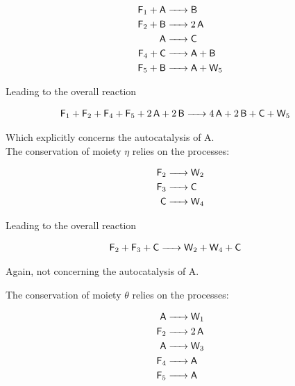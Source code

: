 \documentclass{article}
\begin{document}
\begin{equation}\label{reaction_12}
		\begin{split}
  \ce{\textsf{F}_1 + \textsf{A}& -> \textsf{B}}	\\
  \ce{\textsf{F}_2 + \textsf{B}& -> 2\textsf{A}} \\
  \ce{\textsf{A}& -> \textsf{C}} \\
  \ce{\textsf{F}_4 + \textsf{C}& -> \textsf{A} + \textsf{B}} \\
  \ce{\textsf{F}_5 + \textsf{B}& -> \textsf{A} + \textsf{W}_5 }
		\end{split} 
\end{equation}

Leading to the overall reaction

\begin{equation}
		\begin{split}
  \ce{\textsf{F}_1 + \textsf{F}_2 + \textsf{F}_4 + \textsf{F}_5 + 2\textsf{A} + 2\textsf{B} &-> 4\textsf{A} + 2\textsf{B} + \textsf{C} + \textsf{W}_5 }
		\end{split} 
\end{equation}

Which explicitly concerns the autocatalysis of A. \\

The conservation of moiety $\eta$ relies on the processes:

\begin{equation}\label{reaction_12}
		\begin{split}
  \ce{\textsf{F}_2 & -> \textsf{W}_2}	\\
  \ce{\textsf{F}_3 & -> \textsf{C}} \\
  \ce{\textsf{C}& -> \textsf{W}_4}
		\end{split} 
\end{equation}

Leading to the overall reaction

\begin{equation}
		\begin{split}
  \ce{\textsf{F}_2 + \textsf{F}_3 + \textsf{C} &-> \textsf{W}_2 + \textsf{W}_4 + \textsf{C}}
		\end{split} 
\end{equation}

Again, not concerning the autocatalysis of A.

The conservation of moiety $\theta$ relies on the processes:

\begin{equation}\label{reaction_12}
		\begin{split}
  \ce{\textsf{A} & -> \textsf{W}_1}	\\
  \ce{\textsf{F}_2 & -> 2\textsf{A}} \\
  \ce{\textsf{A} & -> \textsf{W}_3} \\
  \ce{\textsf{F}_4 & -> \textsf{A}} \\
  \ce{\textsf{F}_5 & -> \textsf{A} }
		\end{split} 
\end{equation}
\end{document}
